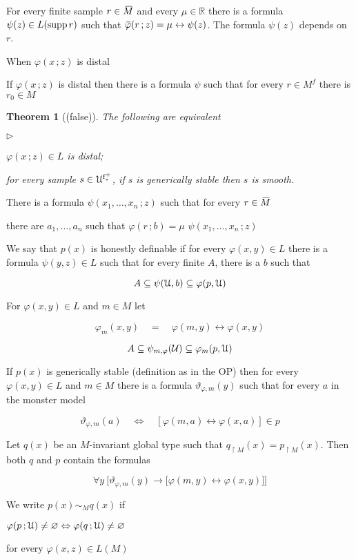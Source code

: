 \documentclass[10pt,openany]{article}
\newcommand{\mylabel}[1]{{\ssf{#1}}\hfill}
\renewenvironment{itemize}
  {\begin{list}{$\triangleright$}{%
   \setlength{\parskip}{0mm}
   \setlength{\topsep}{.4\baselineskip}
   \setlength{\rightmargin}{0mm}
   \setlength{\listparindent}{0mm}
   \setlength{\itemindent}{0mm}
   \setlength{\labelwidth}{3ex}
   \setlength{\itemsep}{.4\baselineskip}
   \setlength{\parsep}{0mm}
   \setlength{\partopsep}{0mm}
   \setlength{\labelsep}{1ex}
   \setlength{\leftmargin}{\labelwidth+\labelsep}
   \let\makelabel\mylabel}}{%
   \end{list}\vspace*{-\parskip}
  }
\def\A{\forall}
\def\RR{\mathds R}
\def\supp{\mathop{\rm supp}}
\newcommand{\sbar}[1]{\mkern 3mu\overline{\mkern-3mu#1\mkern-1mu}\mkern 1mu}
\newcommand{\barM}{\mkern 4mu\overline{\mkern-4mu M\mkern-2mu}\mkern 2mu}
\def\IFF{\Leftrightarrow}
\def\iff{\leftrightarrow}
\def\U{\EuScript U}
\def\0{\varnothing}
\def\phi{\varphi}
\def\ssf#1{\textsf{\small #1}}
\newcounter{thm}[section]
\theoremstyle{mio}
\newtheorem{theorem}[thm]{Theorem}
\theoremstyle{liscio}
\begin{document}
For every finite sample $r\in \barM$ and every $\mu\in\RR$ there is a formula $\psi(z)\in L(\supp r)$ such that $\sbar\phi(r\,;z)=\mu \iff \psi(z)$. The formula $\psi(z)$ depends on $r$.

When $\phi(x\,;z)$ is distal

If  $\phi(x\,;z)$ is distal then there is a formula $\psi$ such that  for every $r\in M^f$ there is $r_0\in M^{}$

\begin{theorem}[(false)]
  The following are equivalent
  \begin{itemize}
    \item[1.] $\phi(x\,;z)\in L$ is distal;
    \item[2.] for every sample $s\in\U^{\rm f^+_*}$, if $s$ is generically stable then $s$ is smooth.

  \end{itemize}
\end{theorem}

There is a formula $\psi(x_1,\dots,x_n\,;z)$ such that for every $r\in \barM$

there are $a_1,\dots,a_n$ such that $\phi(r\,;b)=\mu$ $\psi(x_1,\dots,x_n\,;z)$


We say that $p(x)$ is honestly definable if for every $\varphi(x,y)\in L$ there is a formula $\psi(y,z)\in L$ such that for every finite $A$, there is a $b$ such that

$$A\subseteq\psi(\U,b)\subseteq \phi(p,\U)$$

For $\varphi(x,y)\in L$ and $m\in M$ let 

$$\varphi_m(x,y)\quad=\quad\varphi(m,y)\leftrightarrow\varphi(x,y)$$

$$A \subseteq\psi_{m,\phi}({\cal U})\subseteq \phi_m(p,\U)$$

If $p(x)$ is generically stable (definition as in the OP) then for every $\varphi(x,y)\in L$ and $m\in M$ there is a formula $\vartheta_{\varphi,m}(y)$ such that for every $a$ in the monster model

$$\vartheta_{\varphi,m}(a)\quad\Leftrightarrow\quad[\varphi(m,a)\leftrightarrow\varphi(x,a)]\in p$$

Let $q(x)$ be an $M$-invariant global type such that  $q_{\restriction M}(x)=p_{\restriction M}(x)$. Then both $q$ and $p$ contain the formulas

$$\A y\ \Big[\vartheta_{\varphi,m}(y)\rightarrow\big[\varphi(m,y)\leftrightarrow\varphi(x,y)\big]\Big]$$

We write $p(x)\sim_Mq(x)$ if 

$\phi(p\,;\U)\neq\0\IFF\phi(q\,;\U)\neq\0$ 

for every $\phi(x,z)\in L(M)$ 
\end{document}
